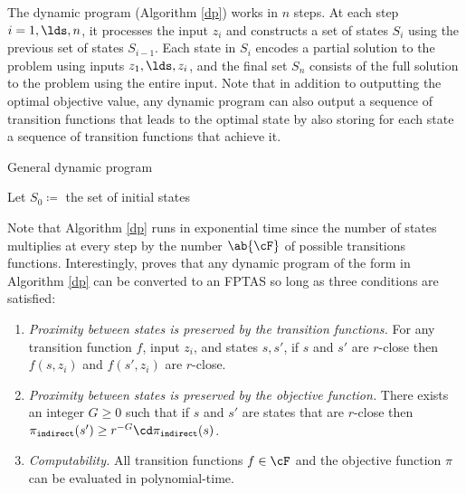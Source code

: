 The dynamic program (Algorithm \ref{dp}) works in $n$ steps. At each step $i = 1, \lds, n$, it processes the input $z_i$ and constructs a set of states $S_i$ using the previous set of states $S_{i-1}$. Each state in $S_i$ encodes a partial solution to the problem using inputs $z_1,\lds,z_i$, and the final set $S_n$ consists of the full solution to the problem using the entire input. Note that in addition to outputting the optimal objective value, any dynamic program can also output a sequence of transition functions that leads to the optimal state by also storing for each state a sequence of transition functions that achieve it.

\begin{algorithm}
        \caption{General dynamic program}
	\label{dp}
        \SetAlgoNoLine
	Let $S_0 \coloneq $ the set of initial states
	

	
\end{algorithm}

Note that Algorithm \ref{dp} runs in exponential time since the number of states multiplies at every step by the number $\ab{\cF}$ of possible transitions functions. Interestingly, \citet{woeginger2000} proves that any dynamic program of the form in Algorithm \ref{dp} can be converted to an FPTAS so long as three conditions are satisfied:


\begin{enumerate}
    \item \emph{Proximity between states is preserved by the transition functions.} For any transition function $f$, input $z_i$, and states $s, s'$, if $s$ and $s'$ are $r$-close then $f(s, z_i)$ and $f(s', z_i)$ are $r$-close.

    \item \emph{Proximity between states is preserved by the objective function.} There exists an integer $G\ge 0$ such that if $s$ and $s'$ are states that are $r$-close then $\pi_{\tt{indirect}}(s') \ge r^{-G} \cd \pi_{\tt{indirect}}(s)$.

    \item \emph{Computability.} All transition functions $f\in \cF$ and the objective function $\pi$ can be evaluated in polynomial-time.
    
\end{enumerate}

